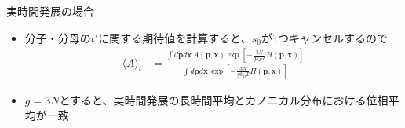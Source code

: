 
\begin{frame}[t,fragile]{実時間発展の場合}
  \begin{itemize}
  \item 分子・分母の$t'$に関する期待値を計算すると、$s_0$が1つキャンセルするので
    \begin{align*}
      \langle A \rangle_t &= \frac{\int d\mathbf{p} d\mathbf{x} \, A(\mathbf{p},\mathbf{x}) \exp [ -\frac{3N}{gk_BT} H(\mathbf{p}, \mathbf{x})]}{\int d\mathbf{p} d\mathbf{x} \, \exp [ -\frac{3N}{gk_BT} H(\mathbf{p}, \mathbf{x})]}
    \end{align*}
    \item {\color{red}$g=3N$}とすると、実時間発展の長時間平均とカノニカル分布における位相平均が一致
  \end{itemize}
\end{frame}
